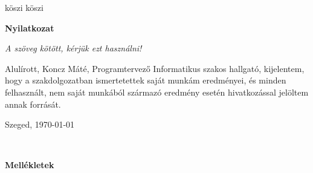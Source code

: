 \documentclass[a4paper,12pt]{report}
\theoremstyle{definition}
\theoremstyle{remark}
\begin{document}

\vspace{2 cm}

köszi köszi

\newpage
{\Huge \bf Nyilatkozat}


\vspace{2 cm}

{\it A szöveg kötött, kérjük ezt használni!}

Alulírott, Koncz Máté, Programtervező Informatikus szakos hallgató, kijelentem, hogy a szakdolgozatban ismertetettek saját munkám eredményei, és minden felhasznált, nem saját munkából származó eredmény esetén hivatkozással jelöltem annak forrását. 


\begin{flushleft}
\vspace*{1cm}
Szeged, \today
\end{flushleft}

\begin{flushright}
 \vspace*{1cm}
 \makebox[7cm]{\rule{6cm}{.4pt}}\\
\end{flushright}

\pagebreak

\newpage
{\Huge \bf Mellékletek}

\begin{center}



\end{center}



\vspace{2 cm}
\end{document}
